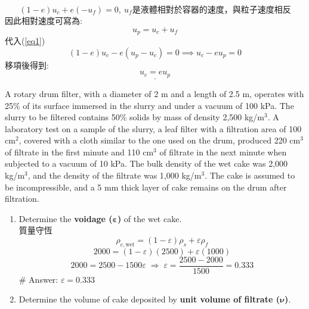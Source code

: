 \documentclass[12pt,a4paper]{article}
\begin{document}
\begin{problems}
\begin{enumerate}
\begin{itemize}
        \begin{equation}
            (1-e)u_c + e(-u_f) = 0,~ u_f\text{是液體相對於容器的速度，與粒子速度相反} \label{eq1}
        \end{equation}
        因此相對速度可寫為:
        \begin{equation}
            u_p = u_c + u_f
        \end{equation}
        代入(\ref{eq1})
        \begin{equation}
            (1-e)u_c - e(u_p-u_c)= 0 \implies u_c - eu_p = 0
        \end{equation}
        移項後得到:
        \begin{equation}
            \underline{u_c = e u_p}
        \end{equation}
    \end{itemize}
\end{enumerate}
A rotary drum filter, with a diameter of 2 m and a length of 2.5 m, operates with 25\% of its
surface immersed in the slurry and under a vacuum of 100 kPa.
The slurry to be filtered contains 50\% solids by mass of density 2,500 kg/$\text{m}^3$.
A laboratory test on a sample of the slurry, 
a leaf filter with a filtration area of 100 cm$^2$, covered with a cloth similar to the one
used on the drum, produced 220 cm$^3$ of filtrate in the first minute and 110 cm$^3$ of filtrate in
the next minute when subjected to a vacuum of 10 kPa. The bulk density of the wet cake was
2,000 kg/m$^3$, and the density of the filtrate was 1,000 kg/m$^3$. The cake is assumed to be
incompressible, and a 5 mm thick layer of cake remains on the drum after filtration.
\begin{enumerate}
    \item Determine the \textbf{voidage ($\boldsymbol{\varepsilon}$)} of the wet cake.\\
    質量守恆
    \begin{equation}
        \rho_{c,\text{wet}}=(1-\varepsilon)\rho_s+\varepsilon\rho_f
    \end{equation}
    \begin{equation}
        2000=(1-\varepsilon)(2500)+\varepsilon(1000)
    \end{equation}
    \begin{equation}
        2000=2500-1500\varepsilon
        \;\Rightarrow\;
        \varepsilon=\frac{2500-2000}{1500}=0.333
    \end{equation}
    \# Answer: \underline{$\varepsilon=0.333$}
    \item Determine the volume of cake deposited by \textbf{unit volume of filtrate ($\boldsymbol\nu$)}.\\

\end{enumerate}
\end{problems}
\end{document}

